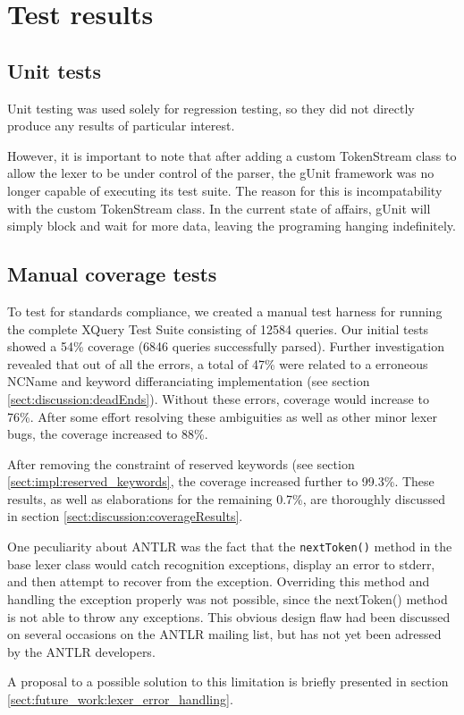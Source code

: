 \section{Test results}
\label{sect:results:tests}
\subsection{Unit tests}
Unit testing was used solely for regression testing, so they did not directly 
produce any results of particular interest.

However, it is important to note that after adding a custom TokenStream class to
allow the lexer to be under control of the parser, the gUnit framework was no
longer capable of executing its test suite. The reason for this is
incompatability with the custom TokenStream class. In the current state of
affairs, gUnit will simply block and wait for more data, leaving the programing
hanging indefinitely. 

\subsection{Manual coverage tests}
\label{sect:tests:manual}
To test for standards compliance, we created a manual test harness for running
the complete XQuery Test Suite\cite{w3c05} consisting of 12584 queries. Our
initial tests showed a 54\% coverage (6846 queries successfully parsed). Further
investigation revealed that out of all the errors, a total of 47\% were related
to a erroneous NCName and keyword differanciating implementation (see section
\ref{sect:discussion:deadEnds}). Without these errors, coverage would increase
to 76\%. After some effort resolving these ambiguities as well as other minor
lexer bugs, the coverage increased to 88\%.

After removing the constraint of reserved keywords (see section
\ref{sect:impl:reserved_keywords}, the coverage increased further to 99.3\%.
These results, as well as elaborations for the remaining 0.7\%, are thoroughly
discussed in section \ref{sect:discussion:coverageResults}.

One peculiarity about ANTLR was the fact that the \verb!nextToken()! method in
the base lexer class would catch recognition exceptions, display an error to stderr, and
then attempt to recover from the exception. Overriding this method and handling
the exception properly was not possible, since the nextToken() method is not
able to throw any exceptions. This obvious design flaw had been discussed on
several occasions on the ANTLR mailing list\cite{antlrmail}, but has not yet
been adressed by the ANTLR developers.

A proposal to a possible solution to this limitation is briefly presented in
section \ref{sect:future_work:lexer_error_handling}.